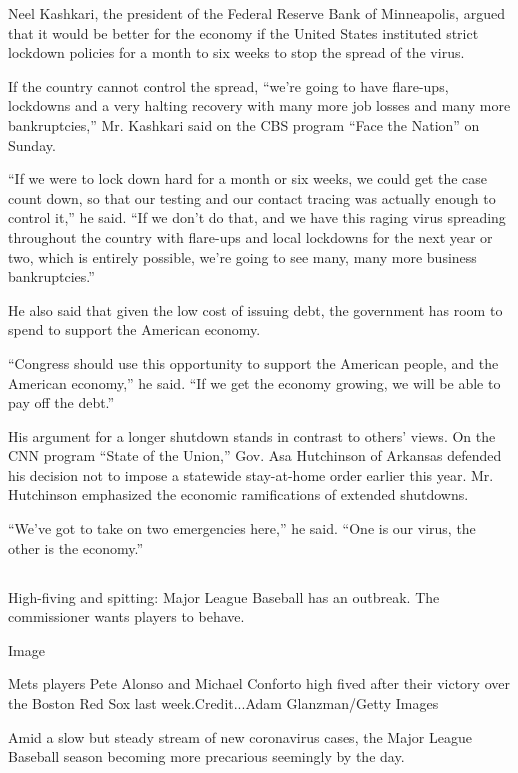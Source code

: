 Neel Kashkari, the president of the Federal Reserve Bank of Minneapolis,
argued that it would be better for the economy if the United States
instituted strict lockdown policies for a month to six weeks to stop the
spread of the virus.

If the country cannot control the spread, ``we're going to have
flare-ups, lockdowns and a very halting recovery with many more job
losses and many more bankruptcies,'' Mr. Kashkari said on the CBS
program ``Face the Nation'' on Sunday.

``If we were to lock down hard for a month or six weeks, we could get
the case count down, so that our testing and our contact tracing was
actually enough to control it,'' he said. ``If we don't do that, and we
have this raging virus spreading throughout the country with flare-ups
and local lockdowns for the next year or two, which is entirely
possible, we're going to see many, many more business bankruptcies.''

He also said that given the low cost of issuing debt, the government has
room to spend to support the American economy.

``Congress should use this opportunity to support the American people,
and the American economy,'' he said. ``If we get the economy growing, we
will be able to pay off the debt.''

His argument for a longer shutdown stands in contrast to others' views.
On the CNN program ``State of the Union,'' Gov. Asa Hutchinson of
Arkansas defended his decision not to impose a statewide stay-at-home
order earlier this year. Mr. Hutchinson emphasized the economic
ramifications of extended shutdowns.

``We've got to take on two emergencies here,'' he said. ``One is our
virus, the other is the economy.''

\hypertarget{-7}{%
\subsection{}\label{-7}}

High-fiving and spitting: Major League Baseball has an outbreak. The
commissioner wants players to behave.

Image

Mets players Pete Alonso and Michael Conforto high fived after their
victory over the Boston Red Sox last week.Credit...Adam Glanzman/Getty
Images

Amid a slow but steady stream of new coronavirus cases, the Major League
Baseball season becoming more precarious seemingly by the day.

